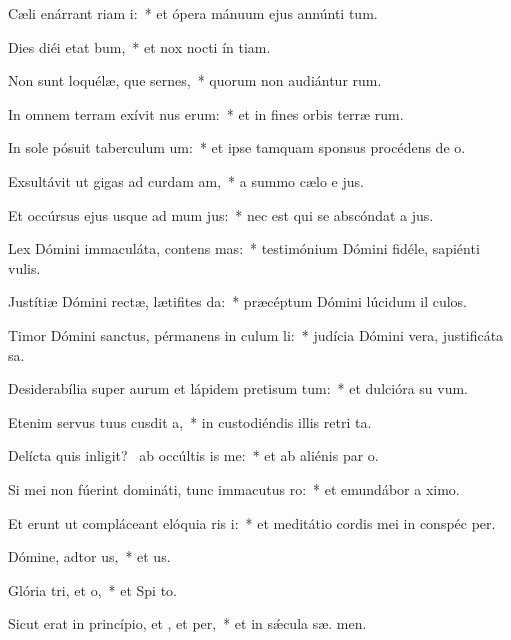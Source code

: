 \item Cæli enárrant riam i:~* et ópera mánuum ejus annúnti tum.
\item Dies diéi etat bum,~* et nox nocti ín tiam.
\item Non sunt loquélæ, que sernes,~* quorum non audiántur  rum.
\item In omnem terram exívit nus erum:~* et in fines orbis terræ  rum.
\item In sole pósuit taberculum um:~* et ipse tamquam sponsus procédens de  o.
\item Exsultávit ut gigas ad curdam am,~* a summo cælo e jus.
\item Et occúrsus ejus usque ad mum jus:~* nec est qui se abscóndat a  jus.
\item Lex Dómini immaculáta, contens mas:~* testimónium Dómini fidéle, sapiénti  vulis.
\item Justítiæ Dómini rectæ, lætifites da:~* præcéptum Dómini lúcidum il culos.
\item Timor Dómini sanctus, pérmanens in culum li:~* judícia Dómini vera, justificáta  sa.
\item Desiderabília super aurum et lápidem pretisum tum:~* et dulcióra su   vum.
\item Etenim servus tuus cusdit a,~* in custodiéndis illis retri ta.
\item Delícta quis inligit?~\pscross{} ab occúltis is  me:~* et ab aliénis par  o.
\item Si mei non fúerint domináti, tunc immacutus ro:~* et emundábor a  ximo.
\item Et erunt ut compláceant elóquia ris i:~* et meditátio cordis mei in conspéc  per.
\item Dómine, adtor us,~* et  us.
\item Glória tri, et o,~* et Spi to.
\item Sicut erat in princípio, et , et per,~* et in sǽcula sæ. men.
